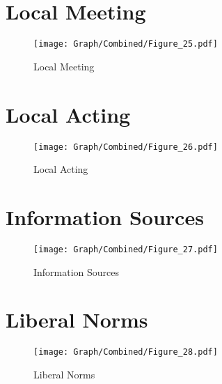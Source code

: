 \documentclass[10pt,a4paper]{article}
\begin{document}
\section{Local Meeting}
\begin{table}[H]\centering

\end{table}
\begin{figure}[H]\centering
\texttt{[image: Graph/Combined/Figure\_25.pdf]}
\caption{Local Meeting} \label{fig:Fig_25}
\end{figure}
\begin{table}[H]\centering

\end{table}
\pagebreak
\section{Local Acting}
\begin{table}[H]\centering

\end{table}
\begin{figure}[H]\centering
\texttt{[image: Graph/Combined/Figure\_26.pdf]}
\caption{Local Acting} \label{fig:Fig_26}
\end{figure}
\begin{table}[H]\centering

\end{table}
\pagebreak
\section{Information Sources}
\begin{table}[H]\centering

\end{table}
\begin{figure}[H]\centering
\texttt{[image: Graph/Combined/Figure\_27.pdf]}
\caption{Information Sources} \label{fig:Fig_27}
\end{figure}
\begin{table}[H]\centering

\end{table}
\pagebreak
\section{Liberal Norms}
\begin{table}[H]\centering

\end{table}
\begin{figure}[H]\centering
\texttt{[image: Graph/Combined/Figure\_28.pdf]}
\caption{Liberal Norms} \label{fig:Fig_28}
\end{figure}
\begin{table}[H]\centering

\end{table}
\pagebreak
\end{document}
